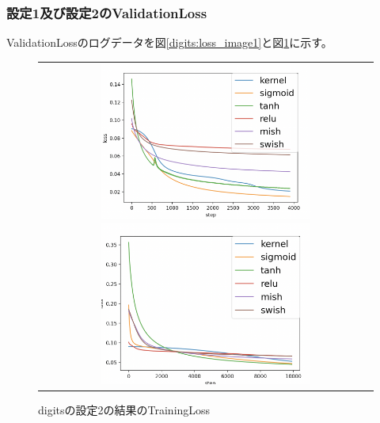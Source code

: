 \subsubsection{設定1及び設定2のValidationLoss}
\label{digits:loss}

ValidationLossのログデータを図\ref{digits:loss_image1}と図\ref{digits:loss_image2}に示す。


\begin{figure}[hbtp]
    \begin{center}
        \begin{tabular}{c}
            \begin{minipage}{0.5\hsize}
                \includegraphics[clip, width=7cm]{asset/digits_0.01_4000_3_002_sgd_non_kaiming_uniform.png}
                    \caption{digitsの設定1の結果のTrainingLoss}
                    \label{digits:loss_image1}
            \end{minipage}
            \hspace{10pt}
            \begin{minipage}{0.5\hsize}
                \includegraphics[clip, width=7cm]{asset/digits_0.001_10000_3_002_adam_non_kaiming_uniform.png}
                    \caption{digitsの設定2の結果のTrainingLoss}
                    \label{digits:loss_image2}
            \end{minipage}
        \end{tabular}
    \end{center}
\end{figure}


